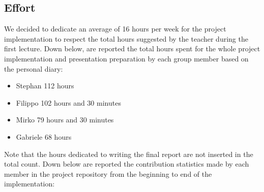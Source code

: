 \subsection{Effort}
We decided to dedicate an average of 16 hours per week for the project implementation to respect the total hours suggested by the teacher during the first lecture.\newline
Down below, are reported the total hours spent for the whole project implementation and presentation preparation by each group member based on the personal diary:
\begin{itemize}
  \item Stephan 112 hours
  \item Filippo 102 hours and 30 minutes
  \item Mirko 79 hours and 30 minutes
  \item Gabriele 68 hours
\end{itemize}
Note that the hours dedicated to writing the final report are not inserted in the total count.\newline
Down below are reported the contribution statistics made by each member in the project repository from the beginning to end of the implementation:
